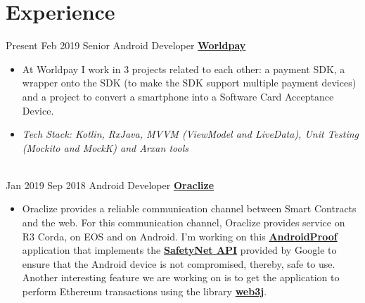 \documentclass[letterpaper]{twentysecondcv} %
\begin{document}
\makeprofile %
\section{Experience}
\begin{twenty} %

\twentyitem
    	{Present}
		{Feb 2019}
        {Senior Android Developer}
        {\href{https://www.worldpay.com/}{\textbf{Worldpay}}}
        {}
        {\begin{itemize}
        
        	\item At Worldpay I work in 3 projects related to each other: a payment SDK, a wrapper onto the SDK (to make the SDK support multiple payment devices) and a project to convert a smartphone into a Software Card Acceptance Device.	 
        	
        	\item \textit{Tech Stack: Kotlin, RxJava, MVVM (ViewModel and LiveData), Unit Testing (Mockito and MockK) and Arxan tools}
        	
        \end{itemize}}
        \\
        
\twentyitem
    	{Jan 2019}
		{Sep 2018}
        {Android Developer}
        {\href{http://www.oraclize.it/}{\textbf{Oraclize}}}
        {}
        {\begin{itemize}
        
        	\item Oraclize provides a reliable communication channel between Smart Contracts and the web. For this communication channel, Oraclize provides service on R3 Corda, on EOS and on Android. I'm working on this \href{https://github.com/oraclize/android-proof}{\textbf{AndroidProof}} application that implements the \href{https://developer.android.com/training/safetynet/}{\textbf{SafetyNet API}} provided by Google to ensure that the Android device is not compromised, thereby, safe to use. Another interesting feature we are working on is to get the application to perform Ethereum transactions using the library \href{https://web3j.io/}{\textbf{web3j}}. 		     
        \end{itemize}}
        \\


\end{twenty}
\end{document}
